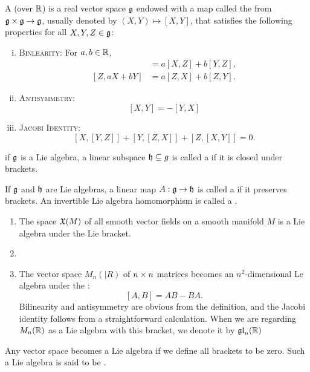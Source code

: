 \dfn A  (over $\mathbb{R}$) is a real vector space $\mathfrak{g}$ endowed with a map called the  from $\mathfrak{g}\times\mathfrak{g}\rightarrow\mathfrak{g}$, usually denoted by $(X,Y)\mapsto[X,Y]$, that satisfies the following properties for all $X,Y,Z\in \mathfrak{g}$:
\begin{enumerate}[(i)]
    \item {\scshape Binlearity:} For $a,b\in \mathbb{R}$,
    \begin{align*}
        [aX + bY, Z] &= a[X,Z] + b[Y,Z],\\
        [Z, aX + bY] &= a[Z,X] + b[Z,Y].
    \end{align*}
    \item {\scshape Antisymmetry:}
    \[[X,Y] = -[Y,X]\]
    \item {\scshape Jacobi Identity:}
    \[[X,[Y,Z]] + [Y,[Z,X]] + [Z,[X,Y]] = 0.\]
\end{enumerate}

\dfn if $\mathfrak{g}$ is a Lie algebra, a linear subspace $\mathfrak{h}\subseteq g$ is called a  if it is closed under brackets.

\dfn If $\mathfrak{g}$ and $\mathfrak{h}$ are Lie algebras, a linear map $A:\mathfrak{g} \rightarrow \mathfrak{h}$ is called a  if it preserves brackets. An invertible Lie algebra homomorphism is called a .

\setcounter{thm}{35}

\begin{ex}\nl
\begin{enumerate}
    \item The space $\mathfrak{X}(M)$ of all smooth vector fields on a smooth manifold $M$ is a Lie algebra under the Lie bracket.
    \item {}
    \item The vector space $M_n(|R)$ of $n\times n$ matrices becomes an $n^2$-dimensional Le algebra under the :
    \[[A,B] = AB - BA.\]
    Bilinearity and antisymmetry are obvious from the definition, and the Jacobi identity follows from a straightforward calculation. When we are regarding $M_n(\mathbb{R})$ as a Lie algebra with this bracket, we denote it by $\mathfrak{gl}_n(\mathbb{R})$
\end{enumerate}
\end{ex}

\dfn Any vector space becomes a Lie algebra if we define all brackets to be zero. Such a Lie algebra is said to be .

